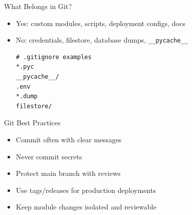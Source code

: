 \begin{frame}[fragile]{What Belongs in Git?}
	\begin{itemize}
		\item Yes: custom modules, scripts, deployment configs, docs
		\item No: credentials, filestore, database dumps, \texttt{\_\_pycache\_\_}
\begin{lstlisting}[style=bash]
# .gitignore examples
*.pyc
__pycache__/
.env
*.dump
filestore/
\end{lstlisting}
	\end{itemize}
\end{frame}

\begin{frame}{Git Best Practices}
	\begin{itemize}
		\item Commit often with clear messages
		\item Never commit secrets
		\item Protect main branch with reviews
		\item Use tags/releases for production deployments
		\item Keep module changes isolated and reviewable
	\end{itemize}
\end{frame}
